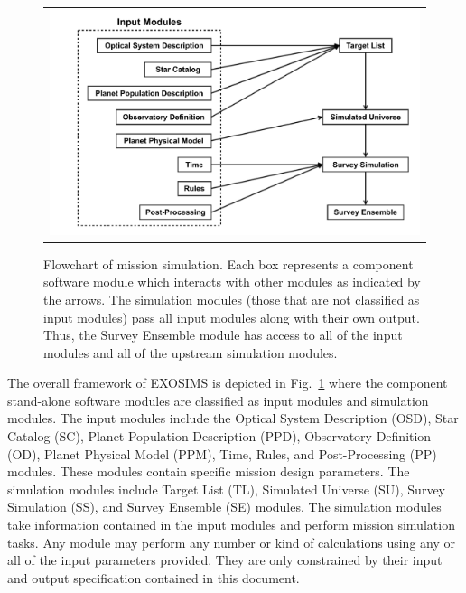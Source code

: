 \documentclass[cleanfoot]{asme2ej}
\begin{document}
\begin{figure}[ht]
    \begin{center}
        \begin{tabular}{c}
             \includegraphics[width=\textwidth]{codeflow2}
        \end{tabular}
    \end{center}
    \caption{Flowchart of mission simulation. Each box represents a component software module which interacts with other modules as indicated by the arrows. The simulation modules (those that are not classified as input modules) pass all input modules along with their own output.  Thus, the Survey Ensemble module has access to all of the input modules and all of the upstream simulation modules.}
    \label{figure_framework}
\end{figure}

The overall framework of EXOSIMS is depicted in Fig.~\ref{figure_framework} where the component stand-alone software modules are classified as input modules and simulation modules.  The input modules include the Optical System Description (OSD), Star Catalog (SC), Planet Population Description (PPD), Observatory Definition (OD), Planet Physical Model (PPM), Time, Rules, and Post-Processing (PP) modules.  These modules contain specific mission design parameters.  The simulation modules include Target List (TL), Simulated Universe (SU), Survey Simulation (SS), and Survey Ensemble (SE) modules.  The simulation modules take information contained in the input modules and perform mission simulation tasks.  Any module may perform any number or kind of calculations using any or all of the input parameters provided.  They are only constrained by their input and output specification contained in this document.
\end{document}
